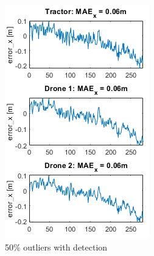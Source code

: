 \documentclass[letterpaper,twocolumn,10pt]{article}
\begin{document}
\begin{figure}[!h]
     \centering
     \begin{subfigure}[b]{0.23\textwidth}
         \centering
         \includegraphics[width=\textwidth]{images/medium_noise_outlier_detection_touse.png}
         \caption{50\% outliers with detection}
         \label{fig:6a}
     \end{subfigure}
     \hfill
     \begin{subfigure}[b]{0.23\textwidth}
         \centering

\end{subfigure}
\end{figure}
\end{document}
